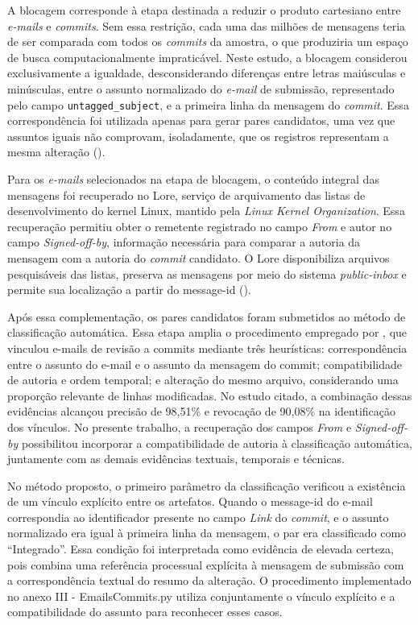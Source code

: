A blocagem corresponde à etapa destinada a reduzir o produto cartesiano entre \textit{e-mails} e \textit{commits}. Sem essa restrição, cada uma das milhões de mensagens teria de ser comparada com todos os \textit{commits} da amostra, o que produziria um espaço de busca computacionalmente impraticável. Neste estudo, a blocagem considerou exclusivamente a igualdade, desconsiderando diferenças entre letras maiúsculas e minúsculas, entre o assunto normalizado do \textit{e-mail} de submissão, representado pelo campo \texttt{untagged\_subject}, e a primeira linha da mensagem do \textit{commit}. Essa correspondência foi utilizada apenas para gerar pares candidatos, uma vez que assuntos iguais não comprovam, isoladamente, que os registros representam a mesma alteração (\cite{ferreira2021incivility}). 

Para os \textit{e-mails} selecionados na etapa de blocagem, o conteúdo integral das mensagens foi recuperado no Lore, serviço de arquivamento das listas de desenvolvimento do kernel Linux, mantido pela \textit{Linux Kernel Organization}. Essa recuperação permitiu obter o remetente registrado no campo \textit{From} e autor no campo \textit{Signed-off-by}, informação necessária para comparar a autoria da mensagem com a autoria do \textit{commit} candidato. O Lore disponibiliza arquivos pesquisáveis das listas, preserva as mensagens por meio do sistema \textit{public-inbox} e permite sua localização a partir do message-id (\cite{linuxkernel_lore}).

Após essa complementação, os pares candidatos foram submetidos ao método de classificação automática. Essa etapa amplia o procedimento empregado por \cite{ferreira2021incivility}, que vinculou e-mails de revisão a commits mediante três heurísticas: correspondência entre o assunto do e-mail e o assunto da mensagem do commit; compatibilidade de autoria e ordem temporal; e alteração do mesmo arquivo, considerando uma proporção relevante de linhas modificadas. No estudo citado, a combinação dessas evidências alcançou precisão de 98,51\% e revocação de 90,08\% na identificação dos vínculos. No presente trabalho, a recuperação dos campos \textit{From} e \textit{Signed-off-by} possibilitou incorporar a compatibilidade de autoria à classificação automática, juntamente com as demais evidências textuais, temporais e técnicas.

No método proposto, o primeiro parâmetro da classificação verificou a existência de um vínculo explícito entre os artefatos. Quando o message-id do e-mail correspondia ao identificador presente no campo \textit{Link} do \textit{commit}, e o assunto normalizado era igual à primeira linha da mensagem, o par era classificado como ``Integrado''. Essa condição foi interpretada como evidência de elevada certeza, pois combina uma referência processual explícita à mensagem de submissão com a correspondência textual do resumo da alteração. O procedimento implementado no anexo III - EmailsCommits.py utiliza conjuntamente o vínculo explícito e a compatibilidade do assunto para reconhecer esses casos. 

